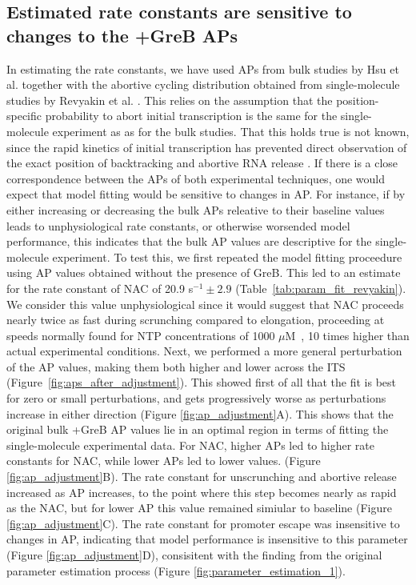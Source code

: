 \subsection{Estimated rate constants are sensitive to changes to the +GreB 
APs}
In estimating the rate constants, we have used APs from bulk studies by Hsu
et al. \cite{hsu_initial_2006} together with the abortive cycling distribution
obtained from single-molecule studies by Revyakin et al.
\cite{revyakin_abortive_2006}. This relies on the assumption that the
position-specific probability to abort initial transcription is the same for
the single-molecule experiment as as for the bulk studies. That this holds
true is not known, since the rapid kinetics of initial transcription
has prevented direct observation of the exact position of backtracking and abortive
RNA release \cite{margeat_direct_2006, revyakin_abortive_2006}. If there is a
close correspondence between the APs of both experimental techniques, one
would expect that model fitting would be sensitive to changes in AP. For
instance, if by either increasing or decreasing the bulk APs releative to
their baseline values leads to unphysiological rate constants, or
otherwise worsended model performance, this indicates that the bulk
AP values are descriptive for the single-molecule experiment.
To test this, we first repeated the model fitting proceedure using AP values
obtained without the presence of GreB. This led to an estimate for the rate
constant of NAC of 20.9 s$^{-1} \pm 2.9$ (Table~\ref{tab:param_fit_revyakin}).
We consider this value unphysiological since it would suggest that NAC
proceeds nearly twice as fast during scrunching compared to elongation,
proceeding at speeds normally found for NTP concentrations of 1000
$\mu$M~\cite{bai_mechanochemical_2007}, 10 times higher than actual
experimental conditions. Next, we performed a more general
perturbation of the AP values, making them both higher and lower across the
ITS (Figure~\ref{fig:aps_after_adjustment}). This showed first of all that the
fit is best for zero or small perturbations, and gets progressively worse as
perturbations increase in either direction (Figure \ref{fig:ap_adjustment}A).
This shows that the original bulk +GreB AP values lie in an optimal region in
terms of fitting the single-molecule experimental data. For NAC, higher APs
led to higher rate constants for NAC, while lower APs led to lower values.
(Figure \ref{fig:ap_adjustment}B). The rate constant for unscrunching and
abortive release increased as AP increases, to the point where this
step becomes nearly as rapid as the NAC, but for lower AP this value remained
simiular to baseline (Figure \ref{fig:ap_adjustment}C). The rate constant for
promoter escape was insensitive to changes in AP, indicating that model
performance is insensitive to this parameter (Figure
\ref{fig:ap_adjustment}D), consisitent with the finding from the original
parameter estimation process (Figure \ref{fig:parameter_estimation_1}).

